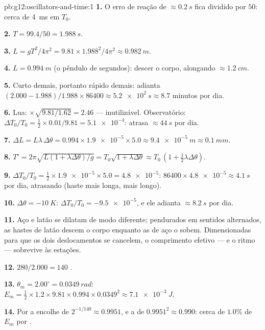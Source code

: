 \begin{solution}{pb:g12:oscillators-and-time:1}
\textbf{1.} O erro de reação de $\approx \qty{0.2}{s}$ fica dividido por
$50$: cerca de \qty{4}{ms} em $T_0$.

\textbf{2.} $T = 99.4/50 = \qty{1.988}{s}$.

\textbf{3.} $L = gT^2/4\pi^2 = 9.81 \times 1.988^2/4\pi^2 \approx
\qty{0.982}{m}$.

\textbf{4.} $L = \qty{0.994}{m}$ (o pêndulo de segundos): descer o corpo,
alongando $\approx \qty{1.2}{cm}$.

\textbf{5.} Curto demais, portanto rápido demais: adianta
$(2.000 - 1.988)/1.988 \times 86400 \approx \qty{5.2e2}{s} \approx 8.7$
minutos por dia.

\textbf{6.} Lua: $\times\sqrt{9.81/1.62} = 2.46$ --- inutilizável.
Observatório: $\Delta T_0/T_0 = \tfrac12 \times 0.01/9.81 =
\num{5.1e-4}$: atrasa $\approx \qty{44}{s}$ por dia.

\textbf{7.} $\Delta L = L\lambda\,\Delta\theta = 0.994 \times
\num{1.9e-5} \times 5.0 \approx \qty{9.4e-5}{m} \approx \qty{0.1}{mm}$.

\textbf{8.} $T' = 2\pi\sqrt{L(1 + \lambda\Delta\theta)/g} =
T_0\sqrt{1 + \lambda\Delta\theta} \approx T_0\,(1 + \tfrac12
\lambda\Delta\theta)$.

\textbf{9.} $\Delta T_0/T_0 = \tfrac12 \times \num{1.9e-5} \times 5.0 =
\num{4.8e-5}$: $86400 \times \num{4.8e-5} \approx \qty{4.1}{s}$ por dia,
atrasando (haste mais longa,  mais longo).

\textbf{10.} $\Delta\theta = \qty{-10}{K}$:
$\Delta T_0/T_0 = \num{-9.5e-5}$, e ele adianta $\approx \qty{8.2}{s}$
por dia.

\textbf{11.} Aço e latão se dilatam de modo diferente; pendurados em
sentidos alternados, as hastes de latão descem o corpo enquanto as de aço
o sobem. Dimensionadas para que os dois deslocamentos se cancelem, o
comprimento efetivo --- e o ritmo --- sobrevive às estações.

\textbf{12.} $280/2.000 = 140$ .

\textbf{13.} $\theta_m = 2.00^\circ = \qty{0.0349}{rad}$:
$E_m = \tfrac12 \times 1.2 \times 9.81 \times 0.994 \times 0.0349^2
\approx \qty{7.1e-3}{J}$.

\textbf{14.} Por  a  encolhe de $2^{-1/140} \approx
0.9951$, e a  de $0.9951^2 \approx 0.990$: cerca de $1.0\%$ de
$E_m$ por .


\end{solution}
